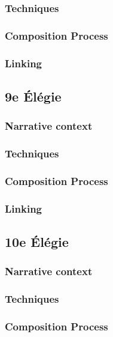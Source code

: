\documentclass[12pt,twoside,maitrise]{dms}
\theoremstyle{definition}
\begin{document}
\subsubsection{Techniques}

\subsubsection{Composition Process}

\subsubsection{Linking}

\subsection{9e Élégie}

\subsubsection{Narrative context}

\subsubsection{Techniques}

\subsubsection{Composition Process}

\subsubsection{Linking}

\subsection{10e Élégie}

\subsubsection{Narrative context}

\subsubsection{Techniques}

\subsubsection{Composition Process}
\end{document}
